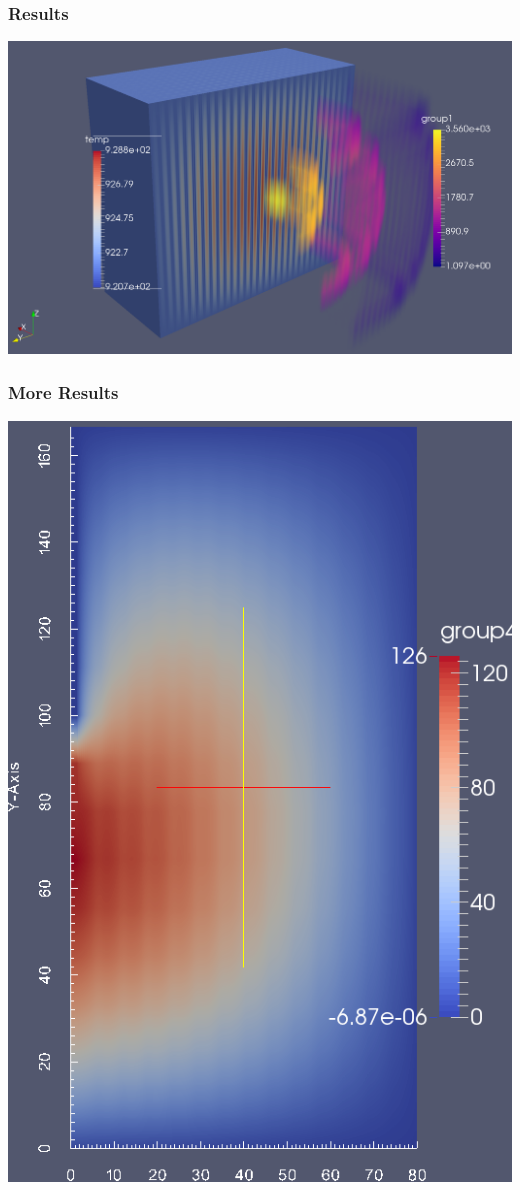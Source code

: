 \begin{frame}
  \frametitle{Results}
  \includegraphics[width=\textwidth]{cuboidal}
\end{frame}

\begin{frame}
    \frametitle{More Results}
    \includegraphics[height=\textheight]{rodded}

\end{frame}
